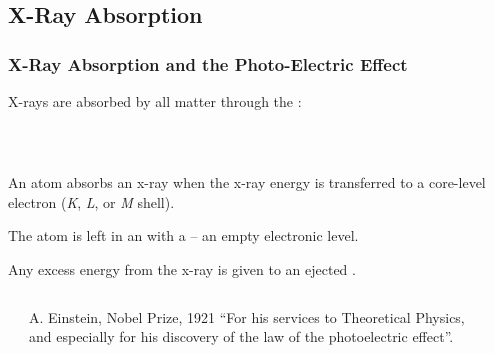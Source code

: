 
\subsection{X-Ray Absorption}
\begin{frame} \frametitle{X-Ray Absorption and the Photo-Electric Effect}

  \begin{cenpage}{89mm}
  X-rays are
  absorbed by all matter through the {}:
  \end{cenpage}

  \vspace{-3mm}

  \begin{columns}[T]
    \begin{column}{50mm}

      \vspace{3mm} {\ }

       \begin{postitbox}{50mm}
        An atom absorbs an x-ray when the x-ray energy is transferred to a
        core-level electron ({\sl{K}}, {\sl{L}}, or {\sl{M}} shell).

          \vmm\vmm

          The atom is left in an {} with a {} -- an empty electronic level.

          \vmm
          Any excess energy from the x-ray is given to an
          ejected {}.
        \end{postitbox}


        \begin{columns}
          \begin{column}{8mm}
          \end{column}
          \begin{column}{40mm}

            {\tiny{A. Einstein, Nobel Prize, 1921 ``For his services to Theoretical Physics, and
               especially for his discovery of the law of the photoelectric
               effect''.}}

          \end{column}
        \end{columns}

      \end{column}
      \begin{column}{62mm}
      \end{column}
    \end{columns}

\vfill
\end{frame}
